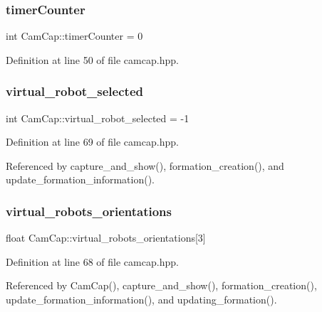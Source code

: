 \subsubsection{\texorpdfstring{timer\+Counter}{timerCounter}}
{\footnotesize\ttfamily int Cam\+Cap\+::timer\+Counter = 0}



Definition at line 50 of file camcap.\+hpp.

\mbox{\label{class_cam_cap_a6709fb57a514b9aa6ee943b2b57fdbe7}} 
\subsubsection{\texorpdfstring{virtual\+\_\+robot\+\_\+selected}{virtual\_robot\_selected}}
{\footnotesize\ttfamily int Cam\+Cap\+::virtual\+\_\+robot\+\_\+selected = -\/1}



Definition at line 69 of file camcap.\+hpp.



Referenced by capture\+\_\+and\+\_\+show(), formation\+\_\+creation(), and update\+\_\+formation\+\_\+information().

\mbox{\label{class_cam_cap_af7519e2b0d2139c7ef95482fa3c03c20}} 
\subsubsection{\texorpdfstring{virtual\+\_\+robots\+\_\+orientations}{virtual\_robots\_orientations}}
{\footnotesize\ttfamily float Cam\+Cap\+::virtual\+\_\+robots\+\_\+orientations\mbox{[}3\mbox{]}}



Definition at line 68 of file camcap.\+hpp.



Referenced by Cam\+Cap(), capture\+\_\+and\+\_\+show(), formation\+\_\+creation(), update\+\_\+formation\+\_\+information(), and updating\+\_\+formation().

\mbox{\label{class_cam_cap_afdbec56c1e17c308441cf2eaad035e45}} 

